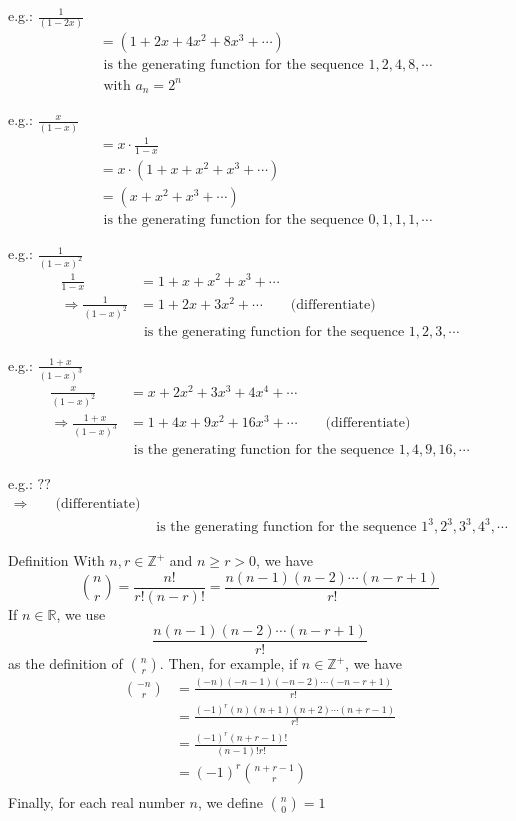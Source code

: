 \documentclass[a4paper]{article}
\begin{document}
\color{red}e.g.: \color{black} $\frac{1}{(1-2x)}$
\begin{align*}
    &=(1+2x+4x^2+8x^3+\cdots)\\
    &\text{ is the generating function for the sequence } 1,2,4,8,\cdots\\
    &\text{ with } a_n=2^n
\end{align*}

\color{red}e.g.: \color{black} $\frac{x}{(1-x)}$
\begin{align*}
    &=x\cdot\frac{1}{1-x}\\
    &=x\cdot(1+x+x^2+x^3+\cdots)\\
    &=(x+x^2+x^3+\cdots)\\
    &\text{ is the generating function for the sequence } 0,1,1,1,\cdots
\end{align*}

\color{red}e.g.: \color{black} $\frac{1}{(1-x)^2}$
\begin{align*}
    \frac{1}{1-x}&=1+x+x^2+x^3+\cdots\\
    \Rightarrow \frac{1}{(1-x)^2}&=1+2x+3x^2+\cdots\qquad\text{(differentiate)}\\
    &\text{ is the generating function for the sequence } 1,2,3,\cdots
\end{align*}

\color{red}e.g.: \color{black} $\frac{1+x}{(1-x)^3}$
\begin{align*}
    \frac{x}{(1-x)^2}&=x+2x^2+3x^3+4x^4+\cdots\\
    \Rightarrow \frac{1+x}{(1-x)^3}&=1+4x+9x^2+16x^3+\cdots\qquad\text{(differentiate)}\\
    &\text{ is the generating function for the sequence } 1,4,9,16,\cdots
\end{align*}

\color{red}e.g.: \color{black} $??$
\begin{align*}
    \Rightarrow \qquad\text{(differentiate)}\\
    &\text{ is the generating function for the sequence } 1^3,2^3,3^3,4^3,\cdots
\end{align*}

\color{green}Definition \color{black} With $n,r\in\mathbb{Z}^+$ and $n\geq r>0$, we have
$$\binom{n}{r}=\frac{n!}{r!(n-r)!}=\frac{n(n-1)(n-2)\cdots(n-r+1)}{r!}$$
If $n\in\mathbb{R}$, we use
$$\frac{n(n-1)(n-2)\cdots(n-r+1)}{r!}$$
as the definition of $\binom{n}{r}$. Then, for example, if $n\in\mathbb{Z}^+$, we have
\begin{align*}
\binom{-n}{r}&=\frac{(-n)(-n-1)(-n-2)\cdots(-n-r+1)}{r!}\\
&=\frac{(-1)^r(n)(n+1)(n+2)\cdots(n+r-1)}{r!}\\
&=\frac{(-1)^r(n+r-1)!}{(n-1)!r!}\\
&=(-1)^r\binom{n+r-1}{r}\\
\end{align*}
Finally, for each real number $n$, we define $\binom{n}{0}=1$
\end{document}
